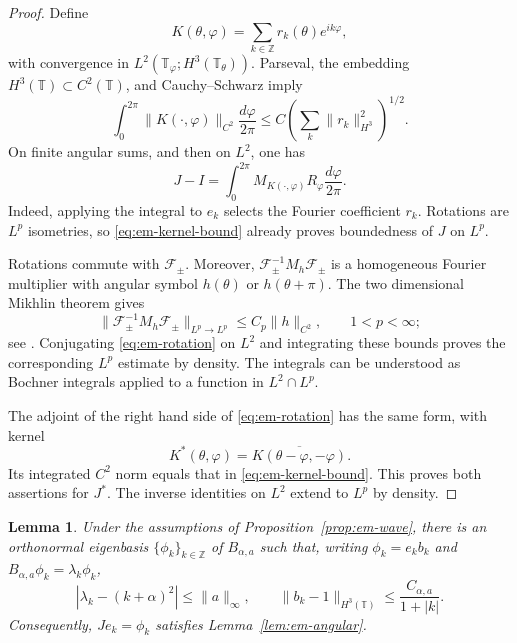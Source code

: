 \documentclass[11pt,a4paper,reqno,backref=page]{amsart}
\newcommand{\Z}{\mathbb Z}
\newcommand{\T}{\mathbb T}
\numberwithin{equation}{section}
\newtheorem{lemma}[theorem]{Lemma}
\theoremstyle{definition}
\theoremstyle{remark}
\begin{document}
\begin{proof}
  Define
  \begin{equation*}
    K(\theta,\varphi)
    =\sum_{k\in\Z}r_k(\theta)e^{ik\varphi},
  \end{equation*}
  with convergence in $L^2(\T_\varphi;H^3(\T_\theta))$.
  Parseval, the embedding $H^3(\T)\subset C^2(\T)$, and
  Cauchy--Schwarz imply
  \begin{equation}\label{eq:em-kernel-bound}
    \int_0^{2\pi}\|K(\cdot,\varphi)\|_{C^2}
    \frac{d\varphi}{2\pi}
    \le C\left(\sum_k\|r_k\|_{H^3}^2\right)^{1/2}.
  \end{equation}
  On finite angular sums, and then on $L^2$, one has
  \begin{equation}\label{eq:em-rotation}
    J-I=\int_0^{2\pi}
    M_{K(\cdot,\varphi)}R_\varphi
    \frac{d\varphi}{2\pi}.
  \end{equation}
  Indeed, applying the integral to $e_k$ selects the Fourier
  coefficient $r_k$. Rotations are $L^p$ isometries, so
  \eqref{eq:em-kernel-bound} already proves boundedness of
  $J$ on $L^p$.

  Rotations commute with $\mathcal F_\pm$. Moreover,
  $\mathcal F_\pm^{-1}M_h\mathcal F_\pm$ is a homogeneous
  Fourier multiplier with angular symbol $h(\theta)$ or
  $h(\theta+\pi)$. The two dimensional Mikhlin theorem gives
  \begin{equation*}
    \|\mathcal F_\pm^{-1}M_h\mathcal F_\pm\|_{L^p\to L^p}
    \le C_p\|h\|_{C^2},\qquad 1<p<\infty;
  \end{equation*}
  see \cite{Grafakos2014}. Conjugating
  \eqref{eq:em-rotation} on $L^2$ and integrating these bounds
  proves the corresponding $L^p$ estimate by density. The
  integrals can be understood as Bochner integrals applied to
  a function in $L^2\cap L^p$.

  The adjoint of the right hand side of
  \eqref{eq:em-rotation} has the same form, with kernel
  \begin{equation*}
    K^*(\theta,\varphi)
    =\overline{K(\theta-\varphi,-\varphi)}.
  \end{equation*}
  Its integrated $C^2$ norm equals that in
  \eqref{eq:em-kernel-bound}. This proves both assertions for
  $J^*$. The inverse identities on $L^2$ extend to $L^p$ by
  density.
\end{proof}

\begin{lemma}\label{lem:em-eigenbasis}
  Under the assumptions of Proposition~\ref{prop:em-wave}, there
  is an orthonormal eigenbasis $\{\phi_k\}_{k\in\Z}$ of
  $B_{\alpha,a}$ such that, writing
  $\phi_k=e_k b_k$ and $B_{\alpha,a}\phi_k=\lambda_k\phi_k$,
  \begin{equation}\label{eq:em-basis-estimate}
    |\lambda_k-(k+\alpha)^2|\le\|a\|_\infty,
    \qquad
    \|b_k-1\|_{H^3(\T)}
    \le\frac{C_{\alpha,a}}{1+|k|}.
  \end{equation}
  Consequently, $Je_k=\phi_k$ satisfies
  Lemma~\ref{lem:em-angular}.
\end{lemma}
\end{document}
